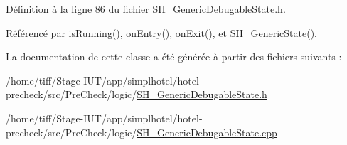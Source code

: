 Définition à la ligne \hyperlink{SH__GenericDebugableState_8h_source_l00086}{86} du fichier \hyperlink{SH__GenericDebugableState_8h_source}{S\-H\-\_\-\-Generic\-Debugable\-State.\-h}.



Référencé par \hyperlink{classSH__GenericState_a5f731810dad0cacd28828ccbf1539e4e}{is\-Running()}, \hyperlink{classSH__GenericState_a68c67ef95738e01cd34cd5926f4932fb}{on\-Entry()}, \hyperlink{classSH__GenericState_a7f7863859318c70c9b734be5bf5510b0}{on\-Exit()}, et \hyperlink{classSH__GenericState_a3cc3cb1491b812dfdd032fc6438dfd4e}{S\-H\-\_\-\-Generic\-State()}.



La documentation de cette classe a été générée à partir des fichiers suivants \-:\begin{DoxyCompactItemize}
\item 
/home/tiff/\-Stage-\/\-I\-U\-T/app/simplhotel/hotel-\/precheck/src/\-Pre\-Check/logic/\hyperlink{SH__GenericDebugableState_8h}{S\-H\-\_\-\-Generic\-Debugable\-State.\-h}\item 
/home/tiff/\-Stage-\/\-I\-U\-T/app/simplhotel/hotel-\/precheck/src/\-Pre\-Check/logic/\hyperlink{SH__GenericDebugableState_8cpp}{S\-H\-\_\-\-Generic\-Debugable\-State.\-cpp}\end{DoxyCompactItemize}
